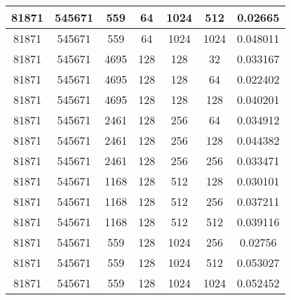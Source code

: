 \documentclass[9pt]{article}
\begin{document}
\begin{tabular}{|c|c|c|c|c|c|c| }
\hline
81871  & 545671  & 559  & 64  & 1024  & 512  & 0.02665 \\
\hline
81871  & 545671  & 559  & 64  & 1024  & 1024  & 0.048011 \\
\hline
81871  & 545671  & 4695  & 128  & 128  & 32  & 0.033167 \\
\hline
81871  & 545671  & 4695  & 128  & 128  & 64  & 0.022402 \\
\hline
81871  & 545671  & 4695  & 128  & 128  & 128  & 0.040201 \\
\hline
81871  & 545671  & 2461  & 128  & 256  & 64  & 0.034912 \\
\hline
81871  & 545671  & 2461  & 128  & 256  & 128  & 0.044382 \\
\hline
81871  & 545671  & 2461  & 128  & 256  & 256  & 0.033471 \\
\hline
81871  & 545671  & 1168  & 128  & 512  & 128  & 0.030101 \\
\hline
81871  & 545671  & 1168  & 128  & 512  & 256  & 0.037211 \\
\hline
81871  & 545671  & 1168  & 128  & 512  & 512  & 0.039116 \\
\hline
81871  & 545671  & 559  & 128  & 1024  & 256  & 0.02756 \\
\hline
81871  & 545671  & 559  & 128  & 1024  & 512  & 0.053027 \\
\hline
81871  & 545671  & 559  & 128  & 1024  & 1024  & 0.052452 \\
\hline
\end{tabular}
 
\end{document}
